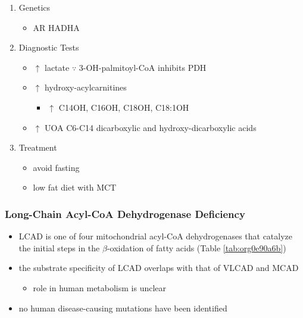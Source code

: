 \documentclass[12pt]{scrartcl}
\begin{document}
\begin{enumerate}
\item Genetics
\label{sec:orgfa38d35}
\begin{itemize}
\item AR HADHA
\end{itemize}

\item Diagnostic Tests
\label{sec:org793fc65}
\begin{itemize}
\item \(\uparrow\) lactate \(\because\) 3-OH-palmitoyl-CoA inhibits PDH
\item \(\uparrow\) hydroxy-acylcarnitines
\begin{itemize}
\item \(\uparrow\) C14OH, C16OH, C18OH, C18:1OH
\end{itemize}
\item \(\uparrow\) UOA C6-C14 dicarboxylic and hydroxy-dicarboxylic acids
\end{itemize}

\item Treatment
\label{sec:orgefb72f7}
\begin{itemize}
\item avoid fasting
\item low fat diet with MCT
\end{itemize}
\end{enumerate}
\subsubsection{Long-Chain Acyl-CoA Dehydrogenase Deficiency}
\label{sec:org221311d}
\begin{itemize}
\item LCAD is one of four mitochondrial acyl-CoA dehydrogenases that
catalyze the initial steps in the \(\beta\)-oxidation of fatty acids
(Table \ref{tab:org0e90a6b})
\item the substrate specificity of LCAD overlaps with that of
VLCAD and MCAD
\begin{itemize}
\item role  in  human  metabolism  is unclear
\end{itemize}
\item no human disease-causing mutations have been identified
\end{itemize}
\end{document}
